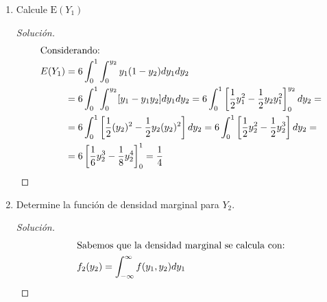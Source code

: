 \documentclass[a4paper,12pt]{article}
\newenvironment{solution}
  {\renewcommand\qedsymbol{$\blacksquare$}\begin{proof}[Solución]}
  {\end{proof}}
\begin{document}
\begin{enumerate}
\begin{solution}
\begin{center}
\begin{tikzpicture}[x=0.75pt,y=0.75pt,yscale=-1,xscale=1]
\end{tikzpicture}
    \end{center}
    Se observa que se puede plantear la siguiente doble integral: 
    $$\int_0^1\int_0^{y_2} k(1-y_2)dy_1dy_2$$
    \begin{align}
        \intertext{Replanteando la doble integral:}
        k\left[\int_0^1\int_0^{y_2} (1-y_2)dy_1dy_2\right] &= k\int_0^1[(1-y_2)y_1|_0^{y_2}]dy_2=\\
        = k\int_0^1 [(1-y_2)y_2]dy_2 &=  k\int_0^1 [y_2-y_2^2]dy_2=\\
        =k\left[\frac{1}{2}y_2^2-\frac{1}{3}y_2^3\right]_0^1 &= k\left[\frac{1}{2}-\frac{1}{3}\right]=k\left[\frac{3}{6}-\frac{2}{6}\right]\\
        &=\frac{k}{6}
        \intertext{Entonces, como sabemos que el valor de la densidad siempre debería integrar a 1, entonces:}
        \frac{k}{6}= 1 \quad;&\quad k=6
        \intertext{Entonces, tenemos:}
        f\left(y_{1}, y_{2}\right)&=\left\{\begin{array}{ll}6\left(1-y_{2}\right) & \text { si } 0 \leq y_{1} \leq y_{2} \leq 1 \\ 0 & \text { si en cualquier otro caso }\end{array}\right.
    \end{align}
    \end{solution}
    \item  Calcule $\mathrm{E}\left(Y_{1}\right)$
    \begin{solution}
    \begin{align}
    \intertext{Considerando:}
        E(Y_1)&=6\int_0^1\int_0^{y_2} y_1(1-y_2)dy_1dy_2\\
        &= 6\int_0^1\int_0^{y_2}[y_1-y_1y_2]dy_1dy_2 =6\int_0^1\left[\frac{1}{2}y_1^2-\frac{1}{2}y_2y_1^2\right]_0^{y_2}dy_2=\\
        &=6\int_0^1\left[\frac{1}{2}(y_2)^2-\frac{1}{2}y_2(y_2)^2\right]dy_2=6\int_0^1\left[\frac{1}{2}y_2^2-\frac{1}{2}y_2^3\right]dy_2=\\
        &= 6\left[\frac{1}{6}y_2^3-\frac{1}{8}y_2^4\right]_0^1=\frac{1}{4}
    \end{align}
    \end{solution}
    \item  Determine la función de densidad marginal para $Y_{2}$.
    \begin{solution}
    \begin{align}
        \intertext{Sabemos que la densidad marginal se calcula con:}
        f_2(y_2)&=\int_{-\infty}^{\infty}f(y_1,y_2)dy_1

\end{align}
\end{solution}
\end{enumerate}
\end{document}
